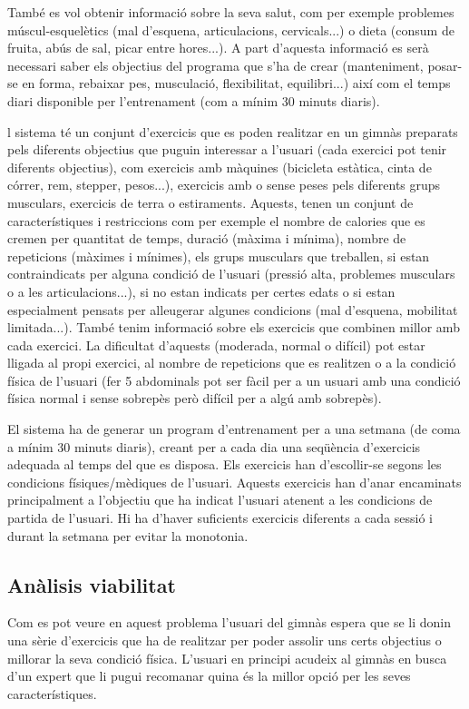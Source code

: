 \documentclass[a4paper, 12pt, UTF8]{article}
\begin{document}
També es vol obtenir informació sobre la seva salut, com per exemple problemes múscul-esquelètics (mal d'esquena, articulacions, cervicals...) o dieta (consum de fruita, abús de sal, picar entre hores...). 
A part d'aquesta informació es serà necessari saber els objectius del programa que s'ha de crear (manteniment, posar-se en forma, rebaixar pes, musculació, flexibilitat, equilibri...) així com el temps diari disponible per l'entrenament (com a mínim 30 minuts diaris).
 
l sistema té un conjunt d'exercicis que es poden realitzar en un gimnàs preparats pels diferents objectius que puguin interessar a l'usuari (cada exercici pot tenir diferents objectius), com exercicis amb màquines (bicicleta estàtica, cinta de córrer, rem, stepper, pesos...), exercicis amb o sense peses pels diferents grups musculars, exercicis de terra o estiraments.
Aquests, tenen un conjunt de característiques i restriccions com per exemple el nombre de calories que es cremen per quantitat de temps, duració (màxima i mínima), nombre de repeticions (màximes i mínimes), els grups musculars que treballen, si estan contraindicats per alguna condició de l'usuari (pressió alta, problemes musculars o a les articulacions...), si no estan indicats per certes edats o si estan especialment pensats per alleugerar algunes condicions (mal d'esquena, mobilitat limitada...). També tenim informació sobre els exercicis que combinen millor amb cada exercici. La dificultat d'aquests (moderada, normal o difícil) pot estar lligada al propi exercici, al nombre de repeticions que es realitzen o a la condició física de l'usuari (fer 5 abdominals pot ser fàcil per a un usuari amb una condició física normal i sense sobrepès però difícil per a algú amb sobrepès).

El sistema ha de generar un program d'entrenament per a una setmana (de coma a mínim 30 minuts diaris), creant per a cada dia una seqüència d'exercicis adequada al temps del que es disposa. Els exercicis han d'escollir-se segons les condicions físiques/mèdiques de l'usuari. Aquests exercicis han d'anar encaminats principalment a l'objectiu que ha indicat l'usuari atenent a les condicions de partida de l'usuari. Hi ha d'haver suficients exercicis diferents a cada sessió i durant la setmana per evitar la monotonia. 

\subsection{Anàlisis viabilitat}
Com es pot veure en aquest problema l'usuari del gimnàs espera que se li donin una sèrie d'exercicis que ha de realitzar per poder assolir uns certs objectius o millorar la seva condició física. L'usuari en principi acudeix al gimnàs en busca d'un expert que li pugui recomanar quina és la millor opció per les seves característiques.
\end{document}
